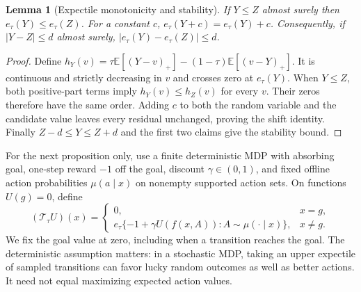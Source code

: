 \documentclass{article}
\newcommand{\EE}{\mathbb E}
\newtheorem{lemma}[theorem]{Lemma}
\theoremstyle{definition}
\theoremstyle{remark}
\begin{document}
\begin{lemma}[Expectile monotonicity and stability]
\label{lem:expectile}
If $Y\le Z$ almost surely then $e_\tau(Y)\le e_\tau(Z)$.
For a constant $c$, $e_\tau(Y+c)=e_\tau(Y)+c$.
Consequently, if $|Y-Z|\le d$ almost surely,
$|e_\tau(Y)-e_\tau(Z)|\le d$.
\end{lemma}
\begin{proof}
Define
$h_Y(v)=\tau\EE[(Y-v)_+]-(1-\tau)\EE[(v-Y)_+]$.
It is continuous and strictly decreasing in $v$ and crosses zero at $e_\tau(Y)$.
When $Y\le Z$, both positive-part terms imply $h_Y(v)\le h_Z(v)$ for every $v$.
Their zeros therefore have the same order. Adding $c$ to both the random variable
and the candidate value leaves every residual unchanged, proving the shift identity.
Finally $Z-d\le Y\le Z+d$ and the first two claims give the stability bound.
\end{proof}

For the next proposition only, use a finite deterministic MDP with absorbing goal,
one-step reward $-1$ off the goal, discount $\gamma\in(0,1)$, and fixed offline action
probabilities $\mu(a\mid x)$ on nonempty supported action sets.
On functions $U(g)=0$, define
\begin{equation}
 (\mathcal T_\tau U)(x)=
 \begin{cases}
  0,&x=g,\\
  e_\tau\{-1+\gamma U(f(x,A)):A\sim\mu(\cdot\mid x)\},&x\ne g .
 \end{cases}
 \label{eq:expectile-operator}
\end{equation}
We fix the goal value at zero, including when a transition reaches the goal.
The deterministic assumption matters: in a stochastic MDP, taking an upper expectile
of sampled transitions can favor lucky random outcomes as well as better actions.
It need not equal maximizing expected action values.
\end{document}
